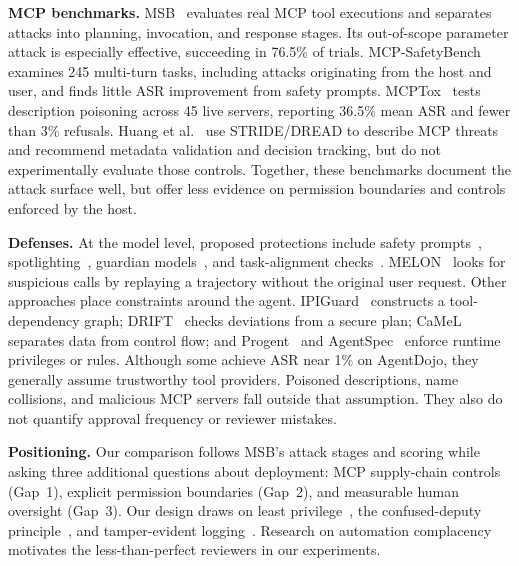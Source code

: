 \documentclass[conference]{IEEEtran}
\begin{document}
\textbf{MCP benchmarks.} MSB~\cite{zhang2026msb} evaluates real MCP tool executions and
separates attacks into planning, invocation, and response stages. Its out-of-scope parameter
attack is especially effective, succeeding in 76.5\% of trials. MCP-SafetyBench~\cite{zong2026mcpsafetybench}
examines 245 multi-turn tasks, including attacks originating from the host and user, and finds
little ASR improvement from safety prompts. MCPTox~\cite{wang2026mcptox} tests description
poisoning across 45 live servers, reporting 36.5\% mean ASR and fewer than 3\% refusals. Huang
et al.~\cite{huang2026mcpthreat} use STRIDE/DREAD to describe MCP threats and recommend metadata
validation and decision tracking, but do not experimentally evaluate those controls. Together, these benchmarks document the attack surface well, but offer less evidence on
permission boundaries and controls enforced by the host.

\textbf{Defenses.} At the model level, proposed protections include safety prompts~\cite{zong2026mcpsafetybench},
spotlighting~\cite{hines2024spotlighting}, guardian models~\cite{inan2023llamaguard,jing2025mcip},
and task-alignment checks~\cite{jia2025taskshield}. MELON~\cite{zhu2025melon} looks for suspicious
calls by replaying a trajectory without the original user request. Other approaches place
constraints around the agent. IPIGuard~\cite{an2025ipiguard} constructs a tool-dependency graph;
DRIFT~\cite{li2025drift} checks deviations from a secure plan; CaMeL~\cite{debenedetti2025camel}
separates data from control flow; and Progent~\cite{shi2025progent} and AgentSpec~\cite{wang2026agentspec}
enforce runtime privileges or rules. Although some achieve ASR near 1\% on AgentDojo, they generally
assume trustworthy tool providers. Poisoned descriptions, name collisions, and malicious MCP
servers fall outside that assumption. They also do not quantify approval frequency or reviewer mistakes.

\textbf{Positioning.} Our comparison follows MSB's attack stages and scoring while asking
three additional questions about deployment: MCP supply-chain controls (Gap~1), explicit permission boundaries
(Gap~2), and measurable human oversight (Gap~3). Our design draws on least
privilege~\cite{saltzer1975protection}, the confused-deputy principle~\cite{hardy1988confused},
and tamper-evident logging~\cite{schneier1999audit}. Research on automation
complacency~\cite{parasuraman2010complacency} motivates the less-than-perfect reviewers in our experiments.

\end{document}
